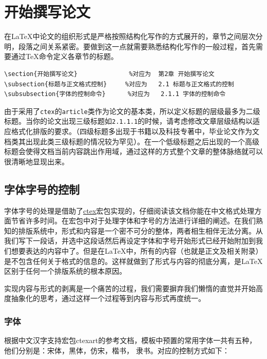 \section{开始撰写论文}
在\LaTeX 中论文的组织形式是严格按照结构化写作的方式展开的，章节之间层次分明，段落之间关系紧密。要做到这一点就需要熟悉结构化写作的一般过程，首先需要通过\TeX 命令定义各章节的标题。
\begin{verbatim}
\section{开始撰写论文}              %对应为  第2章 开始撰写论文
\subsection{标题与正文格式控制}     %对应为   2.1 标题与正文格式的控制 
\subsubsection{字体的控制命令}      %对应为   2.1.1 字体的控制命令
\end{verbatim}
由于采用了\verb|ctex|的\verb|article|类作为论文的基本类，所以定义标题的层级最多为二级标题。当你的论文出现三级标题如\verb|2.1.1.1|的时候，请考虑修改文章层级结构以适应格式化排版的要求。（四级标题多出现于书籍以及科技专著中，毕业论文作为文档类其出现此类三级标题的情况较为罕见）。在一个低级标题之后出现的一个高级标题会使得文档当前内容跳出作用域，通过这样的方式整个文章的整体脉络就可以很清晰地显现出来。
\subsection{字体字号的控制}
字体字号的处理是借助了\href{http://mirror.hust.edu.cn/CTAN/language/chinese/ctex/ctex.pdf}{ctex}宏包实现的，仔细阅读该文档你能在中文格式处理方面节省许多时间。在宏包中对于处理字体和字号的方法进行详细的阐述。在我们熟知的排版系统中，形式和内容是一个密不可分的整体，两者相生相伴无法分离。从我们写下一段话，并选中这段话然后再设定字体和字号开始形式已经开始附加到我们想要表达的内容中了。但是在\LaTeX 中，所有的内容（也就是正文及相关附录）是不包含任何关于格式的信息的。这样就做到了形式与内容的彻底分离，是\LaTeX 区别于任何一个排版系统的根本原因。

实现内容与形式的剥离是一个痛苦的过程，我们需要摒弃我们懒惰的直觉并开始高度抽象化的思考，通过这样一个过程等到内容与形式再度统一。
\subsubsection{字体}
根据中文汉字支持宏包ctexart的参考文档，模板中预置的常用字体一共有五种，他们分别是：宋体，黑体，仿宋，楷书， 隶书。对应的控制方式如下：

